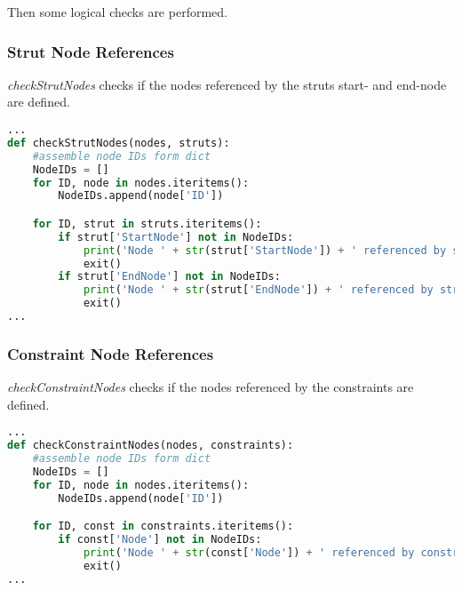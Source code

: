 Then some logical checks are performed.

\subsubsection{Strut Node References}
\label{sec:inputcheck-checkStrutNodes}

\textit{checkStrutNodes} checks if the nodes referenced by the struts start- and end-node are defined.

\begin{inconsolata}
\begin{minipage}{\linewidth}
\begin{lstlisting}[language=python]
...
def checkStrutNodes(nodes, struts):
    #assemble node IDs form dict
    NodeIDs = []
    for ID, node in nodes.iteritems():
        NodeIDs.append(node['ID'])

    for ID, strut in struts.iteritems():
        if strut['StartNode'] not in NodeIDs:
            print('Node ' + str(strut['StartNode']) + ' referenced by strut ' + str(strut['ID']) + ' but not defined.')
            exit()
        if strut['EndNode'] not in NodeIDs:
            print('Node ' + str(strut['EndNode']) + ' referenced by strut ' + str(strut['ID']) + ' but not defined.')
            exit()
...
\end{lstlisting}
\end{minipage}
\end{inconsolata}

\subsubsection{Constraint Node References}
\label{sec:inputcheck-checkConstraintNodes}

\textit{checkConstraintNodes} checks if the nodes referenced by the constraints are defined.

\begin{inconsolata}
\begin{minipage}{\linewidth}
\begin{lstlisting}[language=python]
...
def checkConstraintNodes(nodes, constraints):
    #assemble node IDs form dict
    NodeIDs = []
    for ID, node in nodes.iteritems():
        NodeIDs.append(node['ID'])

    for ID, const in constraints.iteritems():
        if const['Node'] not in NodeIDs:
            print('Node ' + str(const['Node']) + ' referenced by constraint ' + str(ID) + ' but not defined.')
            exit()
...
\end{lstlisting}
\end{minipage}
\end{inconsolata}

